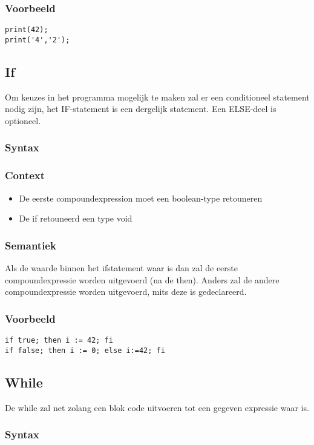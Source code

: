 \documentclass[]{article}
\begin{document}
\subsubsection{Voorbeeld}
\begin{lstlisting}[style=SELMA]
print(42);
print('4','2');
\end{lstlisting}

\subsection{If}
Om keuzes in het programma mogelijk te maken zal er een conditioneel statement nodig zijn, het IF-statement is een dergelijk statement. Een ELSE-deel is optioneel.
\subsubsection{Syntax}

\subsubsection{Context}
\begin{itemize}
\item De eerste compoundexpression moet een boolean-type retouneren
\item De if retouneerd een type void
\end{itemize}
\subsubsection{Semantiek}
Als de waarde binnen het ifstatement waar is dan zal de eerste compoundexpressie worden uitgevoerd (na de then). Anders zal de andere compoundexpressie worden uitgevoerd, mits deze is gedeclareerd.
\subsubsection{Voorbeeld}
\begin{lstlisting}[style=SELMA]
if true; then i := 42; fi
if false; then i := 0; else i:=42; fi
\end{lstlisting}

\subsection{While}
De while zal net zolang een blok code uitvoeren tot een gegeven expressie waar is.
\subsubsection{Syntax}

\end{document}

